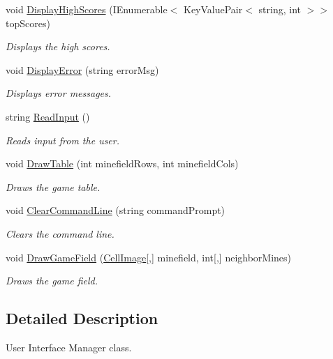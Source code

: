 \begin{DoxyCompactItemize}
void \hyperlink{class_minesweeper_1_1_game_1_1_u_i_manager_a2f3537e693d8efc90cbef90a0a63d34b}{Display\+High\+Scores} (I\+Enumerable$<$ Key\+Value\+Pair$<$ string, int $>$$>$ top\+Scores)
\begin{DoxyCompactList}\small\item\em Displays the high scores. \end{DoxyCompactList}\item 
void \hyperlink{class_minesweeper_1_1_game_1_1_u_i_manager_a67f57db959d9eff2829e1c3c64fb726f}{Display\+Error} (string error\+Msg)
\begin{DoxyCompactList}\small\item\em Displays error messages. \end{DoxyCompactList}\item 
string \hyperlink{class_minesweeper_1_1_game_1_1_u_i_manager_abf069aaf0ff743c8b5f27ea3dba46be4}{Read\+Input} ()
\begin{DoxyCompactList}\small\item\em Reads input from the user. \end{DoxyCompactList}\item 
void \hyperlink{class_minesweeper_1_1_game_1_1_u_i_manager_a4e433f59e1f0787aa4d69683b381dcfe}{Draw\+Table} (int minefield\+Rows, int minefield\+Cols)
\begin{DoxyCompactList}\small\item\em Draws the game table. \end{DoxyCompactList}\item 
void \hyperlink{class_minesweeper_1_1_game_1_1_u_i_manager_acc84e19d875400108a4026cf2861c5d9}{Clear\+Command\+Line} (string command\+Prompt)
\begin{DoxyCompactList}\small\item\em Clears the command line. \end{DoxyCompactList}\item 
void \hyperlink{class_minesweeper_1_1_game_1_1_u_i_manager_af1af79047deb6ba4ec6902a481df1c3e}{Draw\+Game\+Field} (\hyperlink{namespace_minesweeper_adf92d608047dafd69d16008492d317bd}{Cell\+Image}\mbox{[},\mbox{]} minefield, int\mbox{[},\mbox{]} neighbor\+Mines)
\begin{DoxyCompactList}\small\item\em Draws the game field. \end{DoxyCompactList}\end{DoxyCompactItemize}


\subsection{Detailed Description}
User Interface Manager class. 



